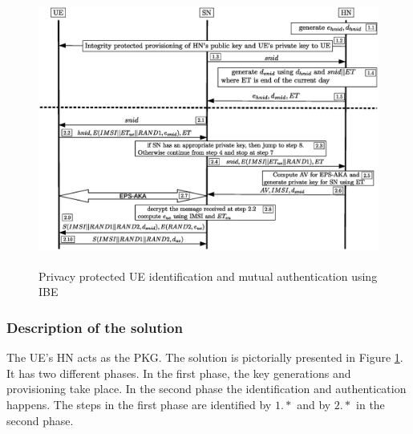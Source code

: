 \documentclass[runningheads,a4paper]{llncs} %
\begin{document}
\begin{figure}
\begin{center}
  \includegraphics[height=9cm]{solution_based_on_ibc.eps}
\caption{Privacy protected UE identification and mutual authentication using IBE}
\label{fig:solution_ibc}       %
\end{center}
\end{figure}

\subsubsection{Description of the solution}
The UE's HN acts as the PKG. The solution is pictorially presented in Figure \ref{fig:solution_ibc}. It has two different phases. In the first phase, the key generations and provisioning take place. In the second phase the identification and authentication happens. The steps in the first phase are identified by $1.*$ and by $2.*$ in the second phase. 
\end{document}
